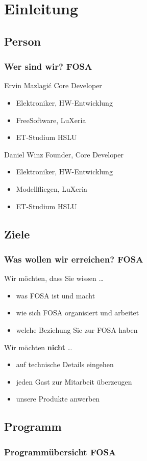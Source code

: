\section{Einleitung}

\subsection{Person}
\begin{frame}
	\frametitle{Wer sind wir? \hfill{} \footnotesize{FOSA}}
	\begin{block}{Ervin Mazlagi\'c 
		\hfill{} 
		\footnotesize{Core Developer}}
		\begin{itemize}
			\item Elektroniker, HW-Entwicklung
			\item FreeSoftware, LuXeria
			\item ET-Studium HSLU
		\end{itemize}
	\end{block}
	\vfill{}
	\begin{block}{Daniel Winz
		\hfill{}
		\footnotesize{Founder, Core Developer}}
		\begin{itemize}
			\item Elektroniker, HW-Entwicklung
			\item Modellfliegen, LuXeria
			\item ET-Studium HSLU
		\end{itemize}
    	\end{block}
\end{frame}

\subsection{Ziele}
\begin{frame}
	\frametitle{Was wollen wir erreichen? \hfill{} \footnotesize{FOSA}}
	\begin{exampleblock}{Wir möchten, dass Sie wissen \dots}
		\begin{itemize}
			\item was FOSA ist und macht
			\item wie sich FOSA organisiert und arbeitet
			\item welche Beziehung Sie zur FOSA haben
		\end{itemize}
	\end{exampleblock}
	\vfill{}
	\begin{alertblock}{Wir möchten \textbf{nicht} \dots}
		\begin{itemize}
			\item auf technische Details eingehen
			\item jeden Gast zur Mitarbeit überzeugen
			\item unsere Produkte anwerben
		\end{itemize}
	\end{alertblock}
\end{frame}

\subsection{Programm}
\begin{frame}
    \frametitle{Programmübersicht \hfill{} \footnotesize{FOSA}}
    \tableofcontents[hideallsubsections]
\end{frame}
